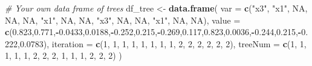 \documentclass[
]{article}
\newenvironment{Shaded}{\begin{snugshade}}{\end{snugshade}}
\newcommand{\AttributeTok}[1]{\textcolor[rgb]{0.13,0.29,0.53}{#1}}
\newcommand{\CommentTok}[1]{\textcolor[rgb]{0.56,0.35,0.01}{\textit{#1}}}
\newcommand{\ConstantTok}[1]{\textcolor[rgb]{0.56,0.35,0.01}{#1}}
\newcommand{\DecValTok}[1]{\textcolor[rgb]{0.00,0.00,0.81}{#1}}
\newcommand{\FloatTok}[1]{\textcolor[rgb]{0.00,0.00,0.81}{#1}}
\newcommand{\FunctionTok}[1]{\textcolor[rgb]{0.13,0.29,0.53}{\textbf{#1}}}
\newcommand{\NormalTok}[1]{#1}
\newcommand{\OtherTok}[1]{\textcolor[rgb]{0.56,0.35,0.01}{#1}}
\newcommand{\SpecialCharTok}[1]{\textcolor[rgb]{0.81,0.36,0.00}{\textbf{#1}}}
\newcommand{\StringTok}[1]{\textcolor[rgb]{0.31,0.60,0.02}{#1}}
\begin{document}
\begin{Shaded}
\begin{Highlighting}[]
\CommentTok{\# Your own data frame of trees}
\NormalTok{df\_tree }\OtherTok{\textless{}{-}} \FunctionTok{data.frame}\NormalTok{(}
  \AttributeTok{var =} \FunctionTok{c}\NormalTok{(}\StringTok{"x3"}\NormalTok{, }\StringTok{"x1"}\NormalTok{, }\ConstantTok{NA}\NormalTok{, }\ConstantTok{NA}\NormalTok{, }\ConstantTok{NA}\NormalTok{, }\StringTok{"x1"}\NormalTok{, }\ConstantTok{NA}\NormalTok{, }\ConstantTok{NA}\NormalTok{, }\StringTok{"x3"}\NormalTok{, }\ConstantTok{NA}\NormalTok{, }\ConstantTok{NA}\NormalTok{, }\StringTok{"x1"}\NormalTok{, }\ConstantTok{NA}\NormalTok{, }\ConstantTok{NA}\NormalTok{),}
  \AttributeTok{value =} \FunctionTok{c}\NormalTok{(}\FloatTok{0.823}\NormalTok{,}\FloatTok{0.771}\NormalTok{,}\SpecialCharTok{{-}}\FloatTok{0.0433}\NormalTok{,}\FloatTok{0.0188}\NormalTok{,}\SpecialCharTok{{-}}\FloatTok{0.252}\NormalTok{,}\FloatTok{0.215}\NormalTok{,}\SpecialCharTok{{-}}\FloatTok{0.269}\NormalTok{,}\FloatTok{0.117}\NormalTok{,}\FloatTok{0.823}\NormalTok{,}\FloatTok{0.0036}\NormalTok{,}\SpecialCharTok{{-}}\FloatTok{0.244}\NormalTok{,}\FloatTok{0.215}\NormalTok{,}\SpecialCharTok{{-}}\FloatTok{0.222}\NormalTok{,}\FloatTok{0.0783}\NormalTok{),}
  \AttributeTok{iteration =} \FunctionTok{c}\NormalTok{(}\DecValTok{1}\NormalTok{, }\DecValTok{1}\NormalTok{, }\DecValTok{1}\NormalTok{, }\DecValTok{1}\NormalTok{, }\DecValTok{1}\NormalTok{, }\DecValTok{1}\NormalTok{, }\DecValTok{1}\NormalTok{, }\DecValTok{1}\NormalTok{, }\DecValTok{2}\NormalTok{, }\DecValTok{2}\NormalTok{, }\DecValTok{2}\NormalTok{, }\DecValTok{2}\NormalTok{, }\DecValTok{2}\NormalTok{, }\DecValTok{2}\NormalTok{),}
  \AttributeTok{treeNum =} \FunctionTok{c}\NormalTok{(}\DecValTok{1}\NormalTok{, }\DecValTok{1}\NormalTok{, }\DecValTok{1}\NormalTok{, }\DecValTok{1}\NormalTok{, }\DecValTok{1}\NormalTok{, }\DecValTok{2}\NormalTok{, }\DecValTok{2}\NormalTok{, }\DecValTok{2}\NormalTok{, }\DecValTok{1}\NormalTok{, }\DecValTok{1}\NormalTok{, }\DecValTok{1}\NormalTok{, }\DecValTok{2}\NormalTok{, }\DecValTok{2}\NormalTok{, }\DecValTok{2}\NormalTok{)}
\NormalTok{)}


\end{Highlighting}
\end{Shaded}
\end{document}
